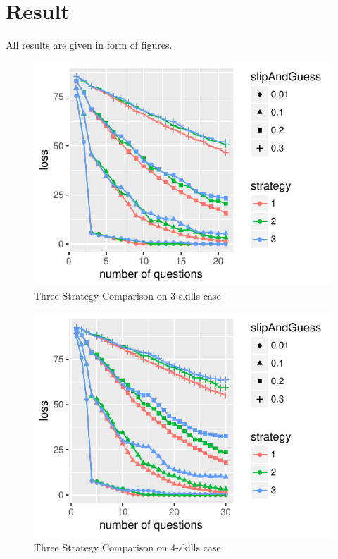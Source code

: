 \documentclass{edm_template}
\begin{document}
\section{Result}
All results are given in form of figures.
\begin{figure}[h!]
  \begin{center}
  \includegraphics[width=\columnwidth]{simResults/LossStrategyComparisonThreeSkills.pdf}
  \end{center}
  \caption{Three Strategy Comparison on 3-skills case}  
  \label{fig:ComparisonThreeSkill}
\end{figure}

\begin{figure}[h!]
  \begin{center}
  \includegraphics[width=\columnwidth]{simResults/LossStrategyComparisonFourSkills.pdf}
  \end{center}
  \caption{Three Strategy Comparison on 4-skills case}  
  \label{fig:ComparisonFourSkill}
\end{figure}
\end{document}
